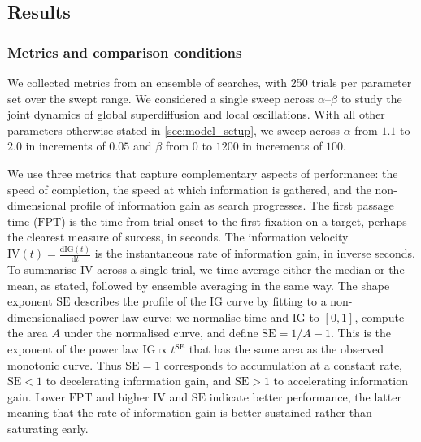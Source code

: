 \subsection{Results}

\subsubsection*{Metrics and comparison conditions}\label{subsec:metrics}
We collected metrics from an ensemble of searches, with 250 trials per parameter set over the swept range. We considered a single sweep across $\alpha$--$\beta$ to study the joint dynamics of global superdiffusion and local oscillations. With all other parameters otherwise stated in \cref{sec:model_setup}, we sweep across $\alpha$ from $1.1$ to $2.0$ in increments of $0.05$ and $\beta$ from $0$ to $1200$ in increments of $100$.

We use three metrics that capture complementary aspects of performance: the speed of completion, the speed at which information is gathered, and the non-dimensional profile of information gain as search progresses. The first passage time ($\mathrm{FPT}$) is the time from trial onset to the first fixation on a target, perhaps the clearest measure of success, in seconds. The information velocity $\mathrm{IV}(t) = \frac{\mathrm{d}\mathrm{IG}(t)}{\mathrm{d}t}$ is the instantaneous rate of information gain, in inverse seconds. To summarise $\mathrm{IV}$ across a single trial, we time-average either the median or the mean, as stated, followed by ensemble averaging in the same way. The shape exponent $\mathrm{SE}$ describes the profile of the $\mathrm{IG}$ curve by fitting to a non-dimensionalised power law curve: we normalise time and $\mathrm{IG}$ to $[0,1]$, compute the area $A$ under the normalised curve, and define $\mathrm{SE} = 1/A - 1$. This is the exponent of the power law $\mathrm{IG} \propto t^{\mathrm{SE}}$ that has the same area as the observed monotonic curve. Thus $\mathrm{SE} = 1$ corresponds to accumulation at a constant rate, $\mathrm{SE}< 1$ to decelerating information gain, and $\mathrm{SE}>1$ to accelerating information gain. Lower $\mathrm{FPT}$ and higher $\mathrm{IV}$ and $\mathrm{SE}$ indicate better performance, the latter meaning that the rate of information gain is better sustained rather than saturating early.

